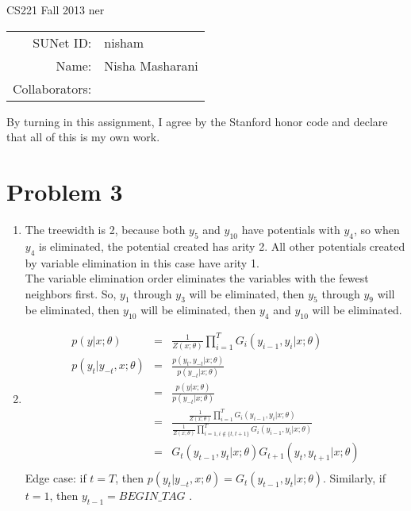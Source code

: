 \documentclass[12pt]{article}
\begin{document}
\begin{center}
{\Large CS221 Fall 2013 ner}

\begin{tabular}{rl}
SUNet ID: & nisham \\
Name: & Nisha Masharani \\
Collaborators: & 
\end{tabular}
\end{center}

By turning in this assignment, I agree by the Stanford honor code and declare
that all of this is my own work.

\section*{Problem 3}

\begin{enumerate}[label=(\alph*)]
  \item The treewidth is 2, because both $y_5$ and $y_10$ have potentials with $y_4$, so when $y_4$ is eliminated, the potential created has arity 2. All other potentials created by variable elimination in this case have arity 1.\\
  The variable elimination order eliminates the variables with the fewest neighbors first. So, $y_1$ through $y_3$ will be eliminated, then $y_5$ through $y_9$ will be eliminated, then $y_10$ will be eliminated, then $y_4$ and $y_10$ will be eliminated.
  \item 
  \begin{eqnarray*}
  p(y | x; \theta) &=& \frac{1}{Z(x;\theta)} \prod_{i = 1}^T G_i(y_{i-1}, y_i| x; \theta)\\
  p(y_t | y_{-t}, x; \theta) &=& \frac{p(y_t, y_{-t} | x; \theta)}{p(y_{-t}| x; \theta)}\\
  &=& \frac{p(y | x; \theta)}{p(y_{-t}| x; \theta)}\\
  &=& \frac{\frac{1}{Z(x;\theta)} \prod_{i = 1}^T G_i(y_{i-1}, y_i| x; \theta)}{\frac{1}{Z(x;\theta)} \prod_{i = 1, i \notin \{t, t+1\}}^T G_i(y_{i-1}, y_i| x; \theta)}\\
  &=& G_t(y_{t-1}, y_t | x; \theta) G_{t+1}(y_t, y_{t+1} | x; \theta)\\
  \end{eqnarray*}
  Edge case: if $t = T$, then $p(y_t | y_{-t}, x; \theta) = G_t(y_{t-1}, y_t | x; \theta)$. Similarly, if $t = 1$, then $y_{t-1} = BEGIN\_TAG$ .\\
\end{enumerate}
\end{document}
